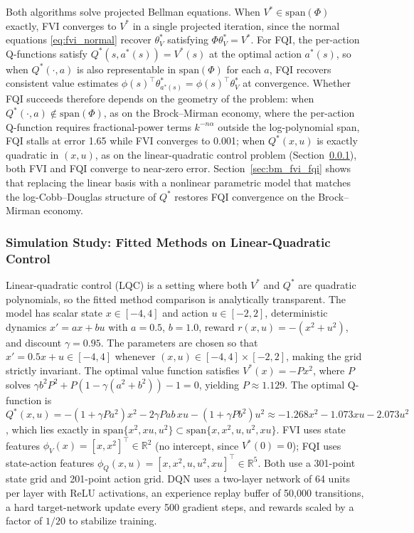 Both algorithms solve projected Bellman equations. When $V^* \in \mathrm{span}(\Phi)$ exactly, FVI converges to $V^*$ in a single projected iteration, since the normal equations \eqref{eq:fvi_normal} recover $\theta_V^*$ satisfying $\Phi \theta_V^* = V^*$. For FQI, the per-action Q-functions satisfy $Q^*(s, a^*(s)) = V^*(s)$ at the optimal action $a^*(s)$, so when $Q^*(\cdot, a)$ is also representable in $\mathrm{span}(\Phi)$ for each $a$, FQI recovers consistent value estimates $\phi(s)^\top \theta_{a^*(s)}^* = \phi(s)^\top \theta_V^*$ at convergence. Whether FQI succeeds therefore depends on the geometry of the problem: when $Q^*(\cdot, a) \notin \mathrm{span}(\Phi)$, as on the Brock--Mirman economy, where the per-action Q-function requires fractional-power terms $k^{-n\alpha}$ outside the log-polynomial span, FQI stalls at error 1.65 while FVI converges to 0.001; when $Q^*(x,u)$ is exactly quadratic in $(x,u)$, as on the linear-quadratic control problem (Section~\ref{sec:lqc_fvi_fqi}), both FVI and FQI converge to near-zero error. Section~\ref{sec:bm_fvi_fqi} shows that replacing the linear basis with a nonlinear parametric model that matches the log-Cobb--Douglas structure of $Q^*$ restores FQI convergence on the Brock--Mirman economy.


\subsubsection{Simulation Study: Fitted Methods on Linear-Quadratic Control}
\label{sec:lqc_fvi_fqi}

Linear-quadratic control (LQC) is a setting where both $V^*$ and $Q^*$ are quadratic polynomials, so the fitted method comparison is analytically transparent. The model has scalar state $x \in [-4, 4]$ and action $u \in [-2, 2]$, deterministic dynamics $x' = ax + bu$ with $a = 0.5$, $b = 1.0$, reward $r(x,u) = -(x^2 + u^2)$, and discount $\gamma = 0.95$. The parameters are chosen so that $x' = 0.5x + u \in [-4, 4]$ whenever $(x, u) \in [-4,4] \times [-2,2]$, making the grid strictly invariant. The optimal value function satisfies $V^*(x) = -Px^2$, where $P$ solves $\gamma b^2 P^2 + P(1 - \gamma(a^2 + b^2)) - 1 = 0$, yielding $P \approx 1.129$. The optimal Q-function is $Q^*(x,u) = -(1+\gamma Pa^2)x^2 - 2\gamma Pab\,xu - (1+\gamma Pb^2)u^2 \approx -1.268x^2 - 1.073xu - 2.073u^2$, which lies exactly in $\mathrm{span}\{x^2, xu, u^2\} \subset \mathrm{span}\{x, x^2, u, u^2, xu\}$. FVI uses state features $\phi_V(x) = [x, x^2]^\top \in \mathbb{R}^2$ (no intercept, since $V^*(0) = 0$); FQI uses state-action features $\phi_Q(x,u) = [x, x^2, u, u^2, xu]^\top \in \mathbb{R}^5$. Both use a 301-point state grid and 201-point action grid. DQN uses a two-layer network of 64 units per layer with ReLU activations, an experience replay buffer of 50,000 transitions, a hard target-network update every 500 gradient steps, and rewards scaled by a factor of $1/20$ to stabilize training.

